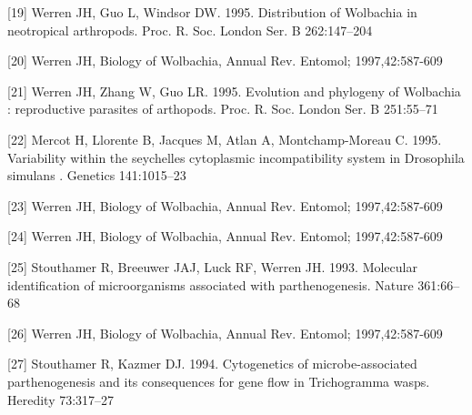 \documentclass[twocolumn]{article}
\begin{document}
[19] Werren JH, Guo L, Windsor DW. 1995. Distribution of Wolbachia in neotropical arthropods. Proc. R. Soc. London Ser. B 262:147–204

[20] Werren JH, Biology of Wolbachia, Annual Rev. Entomol; 1997,42:587-609

[21] Werren JH, Zhang W, Guo LR. 1995. Evolution and phylogeny of Wolbachia : reproductive parasites of arthopods. Proc. R. Soc. London Ser. B 251:55–71 

[22] Mercot H, Llorente B, Jacques M, Atlan A, Montchamp-Moreau C. 1995. Variability within the seychelles cytoplasmic incompatibility system in Drosophila simulans . Genetics 141:1015–23

[23] Werren JH, Biology of Wolbachia, Annual Rev. Entomol; 1997,42:587-609

[24] Werren JH, Biology of Wolbachia, Annual Rev. Entomol; 1997,42:587-609

[25] Stouthamer R, Breeuwer JAJ, Luck RF, Werren JH. 1993. Molecular identification of microorganisms associated with parthenogenesis. Nature 361:66–68

[26] Werren JH, Biology of Wolbachia, Annual Rev. Entomol; 1997,42:587-609

[27] Stouthamer R, Kazmer DJ. 1994. Cytogenetics of microbe-associated parthenogenesis and its consequences for gene flow in Trichogramma wasps. Heredity 73:317–27 
\end{document}
